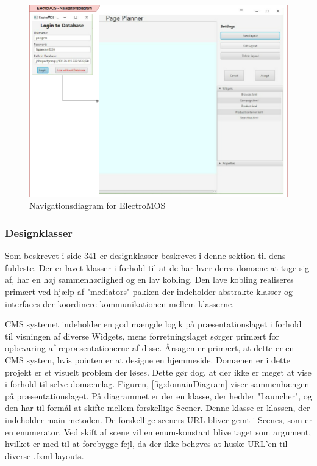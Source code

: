     \begin{figure}[H]
      \includegraphics[width=\linewidth]{elaborationsdokumentet/figurer/design/soft-ark/Navigationsdiagram-ElectroMOS.png}
      \caption{Navigationsdiagram for ElectroMOS}
      \label{Navigationsdiagram-ElectroMOS}
  \end{figure}

\subsubsection{Designklasser}\label{Designklasser}
Som beskrevet i \cite{A&N} side 341 er designklasser beskrevet i denne sektion til dens fuldeste. Der er lavet klasser i forhold til at de har hver deres domæne at tage sig af, har en høj sammenhørlighed og en lav kobling. Den lave kobling realiseres primært ved hjælp af "mediators" pakken der indeholder abstrakte klasser og interfaces der koordinere kommunikationen mellem klasserne.


CMS systemet indeholder en god mængde logik på præsentationslaget i forhold til visningen af diverse Widgets, mens forretningslaget sørger primært for opbevaring af repræsentationerne af disse. Årsagen er primært, at dette er en CMS system, hvis pointen er at designe en hjemmeside. Domænen er i dette projekt er et visuelt problem der løses.
Dette gør dog, at der ikke er meget at vise i forhold til selve domænelag. Figuren, \ref{fig:domainDiagram} viser sammenhængen på præsentationslaget.
På diagrammet er der en klasse, der hedder "Launcher", og den har til formål at skifte mellem forskellige Scener. Denne klasse er klassen, der indeholder main-metoden. De forskellige sceners URL bliver gemt i Scenes, som er en enumerator. Ved skift af scene vil en enum-konstant blive taget som argument, hvilket er med til at forebygge fejl, da der ikke behøves at huske URL'en til diverse .fxml-layouts. 

